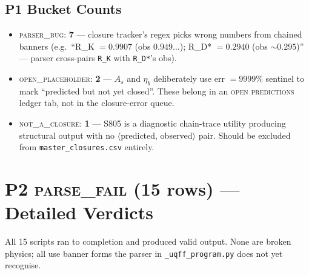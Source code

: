 \documentclass[11pt]{article}
\begin{document}
\subsection*{P1 Bucket Counts}
\begin{itemize}
  \item \textsc{parser\_bug}: \textbf{7} --- closure tracker's regex picks wrong numbers from chained banners (e.g.\ ``R\_K $= 0.9907$ (obs $0.949\ldots$); R\_D* $= 0.2940$ (obs $\sim 0.295$)'' --- parser cross-pairs \texttt{R\_K} with \texttt{R\_D*}'s obs).
  \item \textsc{open\_placeholder}: \textbf{2} --- $A_s$ and $\eta_b$ deliberately use err $= 9999\%$ sentinel to mark ``predicted but not yet closed''. These belong in an \textsc{open predictions} ledger tab, not in the closure-error queue.
  \item \textsc{not\_a\_closure}: \textbf{1} --- S805 is a diagnostic chain-trace utility producing structural output with no $\langle$predicted, observed$\rangle$ pair. Should be excluded from \texttt{master\_closures.csv} entirely.
\end{itemize}

\section{P2 \textsc{parse\_fail} (15 rows) --- Detailed Verdicts}
All 15 scripts ran to completion and produced valid output. None are broken physics; all use banner forms the parser in \texttt{\_uqff\_program.py} does not yet recognise.
\end{document}
